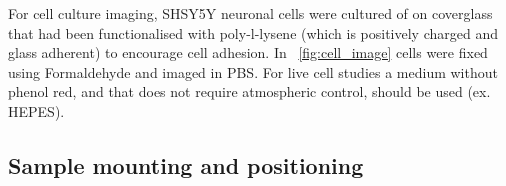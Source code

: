 For cell culture imaging, SHSY5Y neuronal cells were cultured of on coverglass that had been functionalised with poly-l-lysene (which is positively charged and glass adherent) to encourage cell adhesion.
In \figurename~\ref{fig:cell_image} cells were fixed using Formaldehyde and imaged in \gls{PBS}.
For live cell studies a medium without phenol red, and that does not require atmospheric control, should be used (ex. HEPES).

\subsection{Sample mounting and positioning}

